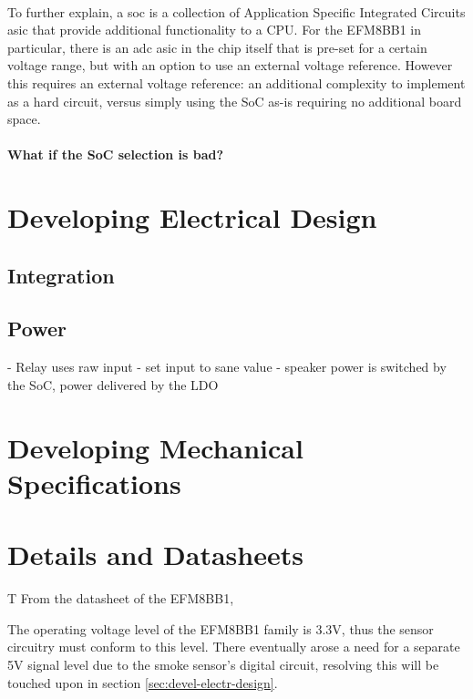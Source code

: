 \documentclass[12pt]{article}
\begin{document}
    \paragraph{}
    To further explain, a \acrlong{soc} is a collection of Application Specific Integrated Circuits \acrshort{asic} that provide additional functionality to a CPU. For the EFM8BB1 in particular, there is an \acrfull{adc} \acrshort{asic} in the chip itself that is pre-set for a certain voltage range, but with an option to use an external voltage reference. However this requires an external voltage reference: an additional complexity to implement as a hard circuit, versus simply using the SoC as-is requiring no additional board space.
  
    \paragraph{What if the SoC selection is bad?}

  
	
	
	
	\section{Developing Electrical Design\label{sec:devel-electr-design}} 

  \subsection{Integration\label{sec:integration}}

	\subsection{Power}
  

  - Relay uses raw input - set input to sane value
  - speaker power is switched by the SoC, power delivered by the LDO
	
	\section{Developing Mechanical Specifications}
	
	\section{Details and Datasheets}
  T
  From the datasheet of the EFM8BB1\cite{silabs:efm8bb1},

  The operating voltage level of the EFM8BB1 family is 3.3V, thus the sensor circuitry must conform to this level. There eventually arose a need for a separate 5V signal level due to the smoke sensor's digital circuit, resolving this will be touched upon in section \ref{sec:devel-electr-design}.
\end{document}
